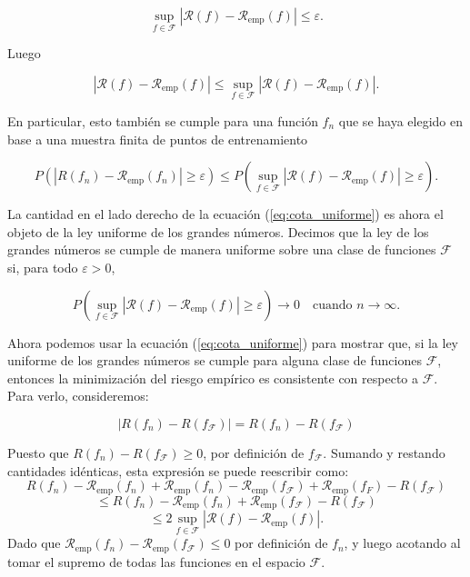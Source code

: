 \documentclass{report}
\begin{document}
\[
\sup_{f \in \mathcal{F}} |\mathcal{R}(f) - \mathcal{R}_{\text{emp}}(f)| \leq \varepsilon.
\]

Luego

\[
|\mathcal{R}(f) - \mathcal{R}_{\text{emp}}(f)| \leq \sup_{f \in \mathcal{F}} |\mathcal{R}(f) - \mathcal{R}_{\text{emp}}(f)|.
\]

En particular, esto también se cumple para una función \(f_n\) que se haya elegido en base a una muestra finita 
de puntos de entrenamiento

\begin{equation}
P(|R(f_n) - \mathcal{R}_{\text{emp}}(f_n)| \geq \varepsilon) \leq P\left(\sup_{f \in \mathcal{F}} |\mathcal{R}(f) - \mathcal{R}_{\text{emp}}(f)| \geq \varepsilon\right). \label{eq:cota_uniforme}
\end{equation}

La cantidad en el lado derecho de la ecuación (\ref{eq:cota_uniforme}) es ahora el objeto de la ley uniforme de los grandes números. 
Decimos que la ley de los grandes números se cumple de manera uniforme sobre una clase de funciones \(\mathcal{F}\) si, 
para todo \(\varepsilon > 0\),

\[
P\left(\sup_{f \in \mathcal{F}} |\mathcal{R}(f) - \mathcal{R}_{\text{emp}}(f)| \geq \varepsilon \right) \to 0 \quad \text{cuando } n \to \infty.
\]

Ahora podemos usar la ecuación (\ref{eq:cota_uniforme}) para mostrar que, si la ley uniforme de los grandes números se cumple para 
alguna clase de funciones \(\mathcal{F}\), entonces la minimización del riesgo empírico es consistente con respecto a \(\mathcal{F}\). 
Para verlo, consideremos:

\[
|R(f_n) - R(f_\mathcal{F})| = R(f_n) - R(f_\mathcal{F})
\]

Puesto que  \(R(f_n) - R(f_\mathcal{F}) \geq 0\), por definición de \(f_\mathcal{F}\). Sumando y restando cantidades idénticas,
esta expresión se puede reescribir como:
\[
R(f_n) - \mathcal{R}_{\text{emp}}(f_n) + \mathcal{R}_{\text{emp}}(f_n) - \mathcal{R}_{\text{emp}}(f_\mathcal{F}) + \mathcal{R}_{\text{emp}}(f_F) - R(f_\mathcal{F})
\]
\[
    \leq R(f_n) - \mathcal{R}_{\text{emp}}(f_n) + \mathcal{R}_{\text{emp}}(f_\mathcal{F}) - R(f_\mathcal{F})
\] 
\[
    \leq 2 \sup_{f \in \mathcal{F}} |\mathcal{R}(f) - \mathcal{R}_{\text{emp}}(f)|.
\]
Dado que \(\mathcal{R}_{\text{emp}}(f_n) - \mathcal{R}_{\text{emp}}(f_\mathcal{F}) \leq 0\) por definición de \(f_n\), y luego acotando
al tomar el supremo de todas las funciones en el espacio $\mathcal{F}$.\\
\end{document}
